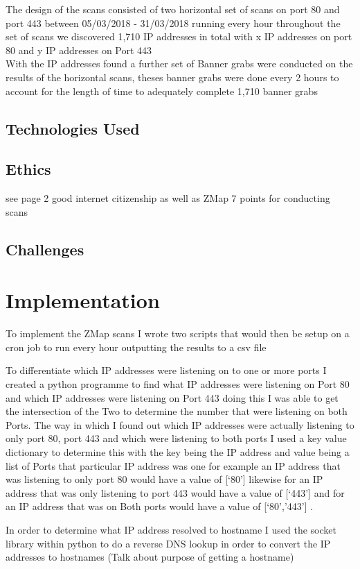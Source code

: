 \documentclass[a4wide,leqno,12pt]{report}
\begin{document}
The design of the scans consisted of two horizontal set of scans on port 80 and port 443 between 05/03/2018 -  31/03/2018 running every hour throughout the set of scans we discovered 1,710 IP addresses in total with x IP addresses on port 80 and y IP addresses on Port 443\\

With the IP addresses found a further set of Banner grabs were conducted on the results of the horizontal scans, theses banner grabs were done every 2 hours to account for the length of time to adequately complete 1,710 banner grabs

\section{Technologies Used} 
\section{Ethics} 
see \cite{durumeric2015search} page 2 good internet citizenship as well as ZMap 7 points for conducting scans
\section{Challenges}
\chapter{Implementation}
To implement the ZMap scans I wrote two scripts that would then be setup on a cron job to run every hour outputting the results to a csv file 

To differentiate which IP addresses were listening on to one or more ports I created a python programme to find what IP addresses were listening on Port 80 and which IP addresses were listening on Port 443 doing this I was able to get the intersection of the Two to determine the number that were listening on both Ports. The way in which I found out which IP addresses were actually listening to only port 80, port 443 and which were listening to both ports I used a key value dictionary to determine this with the key being the IP address and value being a list of Ports that particular IP address was one for example an IP address that was listening to only port 80 would have a value of [‘80’] likewise for an IP address that was only listening to port 443 would have a value of [‘443’] and for an IP address that was on Both ports would have a value of [‘80’,’443’] .

In order to determine what IP address resolved to hostname I used the socket library within python to do a reverse DNS lookup in order to convert the IP addresses to hostnames (Talk about purpose of getting a hostname)\\ 
\end{document}
